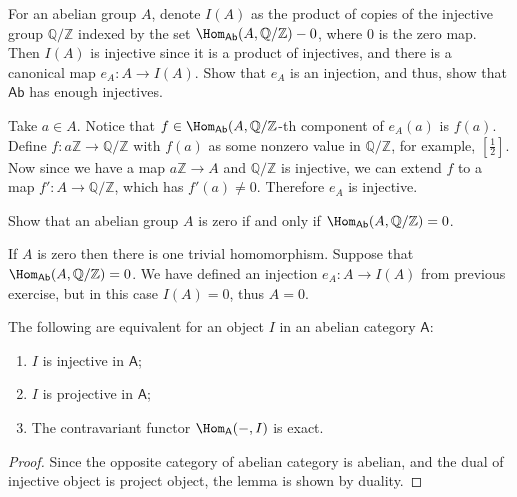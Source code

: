 \begin{exer} For an abelian group $A$, denote $I(A)$ as the product of copies of the injective group $\mathbb{Q}/\mathbb{Z}$ indexed by the set $\Hom_{\textsf{Ab}}(A,\mathbb{Q}/\mathbb{Z})-0$, where $0$ is the zero map. Then $I(A)$ is injective since it is a product of injectives, and there is a canonical map $e_A:A\rightarrow I(A)$. Show that $e_A$ is an injection, and thus, show that $\mathsf{Ab}$ has enough injectives.
\end{exer}
\begin{solution} Take $a\in A$. Notice that $f\in\Hom_{\textsf{Ab}}(A,\mathbb{Q}/\mathbb{Z}$-th component of $e_A(a)$ is $f(a)$. Define $f:a\mathbb{Z}\rightarrow \mathbb{Q}/\mathbb{Z}$ with $f(a)$ as some nonzero value in $\mathbb{Q}/\mathbb{Z}$, for example, $\left[\frac{1}{2}\right]$. Now since we have a map $a\mathbb{Z}\rightarrow A$ and $\mathbb{Q}/\mathbb{Z}$ is injective, we can extend $f$ to a map $f':A\rightarrow \mathbb{Q}/\mathbb{Z}$, which has $f'(a)\neq 0$. Therefore $e_A$ is injective.
\end{solution}

\begin{exer} Show that an abelian group $A$ is zero if and only if $\Hom_{\mathsf{Ab}}(A,\mathbb{Q}/\mathbb{Z})=0$.
\end{exer}
\begin{solution} If $A$ is zero then there is one trivial homomorphism. Suppose that $\Hom_{\mathsf{Ab}}(A,\mathbb{Q}/\mathbb{Z})=0$. We have defined an injection $e_A:A\rightarrow I(A)$ from previous exercise, but in this case $I(A)=0$, thus $A=0$.
\end{solution}

\begin{lemma} The following are equivalent for an object $I$ in an abelian category $\mathsf{A}$:
\begin{enumerate}
\item $I$ is injective in $\mathsf{A}$;
\item $I$ is projective in $\mathsf{A}$;
\item The contravariant functor $\Hom_{\mathsf{A}}(-,I)$ is exact.
\end{enumerate}
\end{lemma}
\begin{proof} Since the opposite category of abelian category is abelian, and the dual of injective object is project object, the lemma is shown by duality.
\end{proof}

